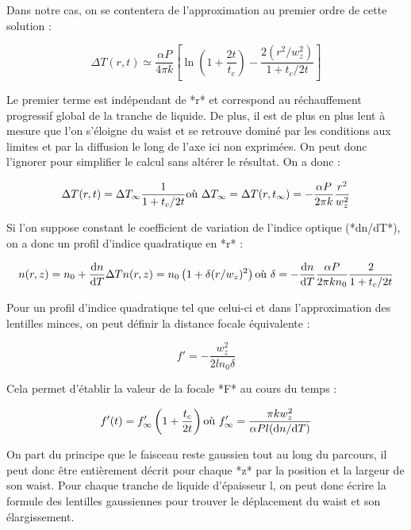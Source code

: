 Dans notre cas, on se contentera de l'approximation au premier ordre de cette solution :

$$
\Delta T(r,t) \simeq \frac{\alpha P}{4\pi k} \left[ \ln\left( 1+\frac{2t}{t_c} \right) - \frac{2(r^2/w_z^2)}{1+t_c/2t} \right]
$$

Le premier terme est indépendant de *r* et correspond au réchauffement progressif global de la tranche de liquide. De plus, il est de plus en plus lent à mesure que l'on s'éloigne du waist et se retrouve dominé par les conditions aux limites et par la diffusion le long de l'axe ici non exprimées. On peut donc l'ignorer pour simplifier le calcul sans altérer le résultat. On a donc :

$$
\Delta T(r,t) = \Delta T_\infty \frac{1}{1+t_c/2t}
\\
\text{où} \ \Delta T_\infty = \Delta T(r,t_\infty) = -\frac{\alpha P}{2\pi k}\frac{r^2}{w_z^2}
$$


Si l'on suppose constant le coefficient de variation de l'indice optique (*dn/dT*), on a donc un profil d'indice quadratique en *r* :

$$
n(r,z) = n_0 + \frac{\mathrm{d}n}{\mathrm{d}T}\Delta T
\\
n(r,z) = n_0 \left( 1+ \delta (r/w_z)^2 \right)
\\
\text{où} \ \delta = - \frac{\mathrm{d}n}{\mathrm{d}T} \frac{\alpha P}{2\pi kn_0} \frac{2}{1+t_c/2t}
$$

Pour un profil d'indice quadratique tel que celui-ci et dans l'approximation des lentilles minces, on peut définir la distance focale équivalente :

$$
f' = -\frac{w^2_z}{2ln_0\delta}
$$

Cela permet d'établir la valeur de la focale *F* au cours du temps :

$$
f'(t) = f'_\infty \left( 1 + \frac{t_c}{2t} \right)
\\
\text{où} \ f'_\infty = \frac{\pi k w_z^2}{\alpha Pl(\mathrm{d}n/\mathrm{d}T)}
$$

On part du principe que le faisceau reste gaussien tout au long du parcours, il peut donc être entièrement décrit pour chaque *z* par la position et la largeur de son waist. Pour chaque tranche de liquide d'épaisseur l, on peut donc écrire la formule des lentilles gaussiennes pour trouver le déplacement du waist et son élargissement.

